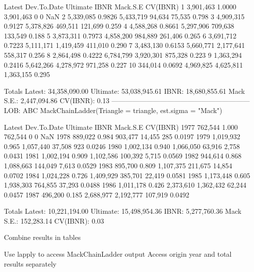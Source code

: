 \documentclass[a4paper]{article}
\begin{document}
\begin{Schunk}
\begin{Soutput}
      Latest Dev.To.Date  Ultimate      IBNR  Mack.S.E CV(IBNR)
1  3,901,463      1.0000 3,901,463         0         0      NaN
2  5,339,085      0.9826 5,433,719    94,634    75,535    0.798
3  4,909,315      0.9127 5,378,826   469,511   121,699    0.259
4  4,588,268      0.8661 5,297,906   709,638   133,549    0.188
5  3,873,311      0.7973 4,858,200   984,889   261,406    0.265
6  3,691,712      0.7223 5,111,171 1,419,459   411,010    0.290
7  3,483,130      0.6153 5,660,771 2,177,641   558,317    0.256
8  2,864,498      0.4222 6,784,799 3,920,301   875,328    0.223
9  1,363,294      0.2416 5,642,266 4,278,972   971,258    0.227
10   344,014      0.0692 4,969,825 4,625,811 1,363,155    0.295

                  Totals
Latest:    34,358,090.00
Ultimate:  53,038,945.61
IBNR:      18,680,855.61
Mack S.E.:  2,447,094.86
CV(IBNR):           0.13
------------------------------------------------------------ 
LOB: ABC
MackChainLadder(Triangle = triangle, est.sigma = "Mack")

        Latest Dev.To.Date  Ultimate      IBNR Mack.S.E CV(IBNR)
1977   762,544       1.000   762,544         0        0      NaN
1978   889,022       0.984   903,477    14,455      285   0.0197
1979 1,019,932       0.965 1,057,440    37,508      923   0.0246
1980 1,002,134       0.940 1,066,050    63,916    2,758   0.0431
1981 1,002,194       0.909 1,102,586   100,392    5,715   0.0569
1982   944,614       0.868 1,088,663   144,049    7,613   0.0529
1983   895,700       0.809 1,107,375   211,675   14,854   0.0702
1984 1,024,228       0.726 1,409,929   385,701   22,419   0.0581
1985 1,173,448       0.605 1,938,303   764,855   37,293   0.0488
1986 1,011,178       0.426 2,373,610 1,362,432   62,244   0.0457
1987   496,200       0.185 2,688,977 2,192,777  107,919   0.0492

                  Totals
Latest:    10,221,194.00
Ultimate:  15,498,954.36
IBNR:       5,277,760.36
Mack S.E.:    152,283.14
CV(IBNR):           0.03
\end{Soutput}
\end{Schunk}
Combine results in tables

Use lapply to access MackChainLadder output
Access origin year and total results separately
\end{document}
